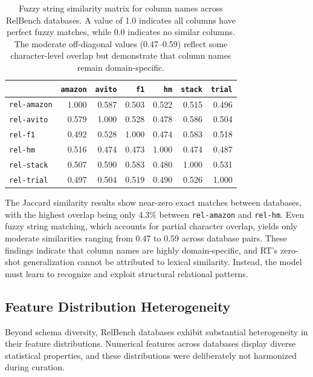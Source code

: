 \begin{table}[t]
\centering
\scriptsize

\begin{tabular}{lrrrrrr}
\toprule
 & \texttt{amazon} & \texttt{avito} & \texttt{f1} & \texttt{hm} & \texttt{stack} & \texttt{trial} \\
\midrule
\texttt{rel-amazon} & 1.000 & 0.587 & 0.503 & 0.522 & 0.515 & 0.496 \\
\texttt{rel-avito}  & 0.579 & 1.000 & 0.528 & 0.478 & 0.586 & 0.504 \\
\texttt{rel-f1}     & 0.492 & 0.528 & 1.000 & 0.474 & 0.583 & 0.518 \\
\texttt{rel-hm}     & 0.516 & 0.474 & 0.473 & 1.000 & 0.474 & 0.487 \\
\texttt{rel-stack}  & 0.507 & 0.590 & 0.583 & 0.480 & 1.000 & 0.531 \\
\texttt{rel-trial}  & 0.497 & 0.504 & 0.519 & 0.490 & 0.526 & 1.000 \\
\bottomrule
\end{tabular}

\caption{Fuzzy string similarity matrix for column names across RelBench databases. A value of 1.0 indicates all columns have perfect fuzzy matches, while 0.0 indicates no similar columns. The moderate off-diagonal values (0.47--0.59) reflect some character-level overlap but demonstrate that column names remain domain-specific.}
\label{tab:fuzzy_similarity}
\end{table}


The Jaccard similarity results show near-zero exact matches between databases, with the highest overlap being only 4.3\% between \texttt{rel-amazon} and \texttt{rel-hm}. Even fuzzy string matching, which accounts for partial character overlap, yields only moderate similarities ranging from 0.47 to 0.59 across database pairs. These findings indicate that column names are highly domain-specific, and RT's zero-shot generalization cannot be attributed to lexical similarity. Instead, the model must learn to recognize and exploit structural relational patterns.


\subsection{Feature Distribution Heterogeneity}


Beyond schema diversity, RelBench databases exhibit substantial heterogeneity in their feature distributions. Numerical features across databases display diverse statistical properties, and these distributions were deliberately not harmonized during curation.



